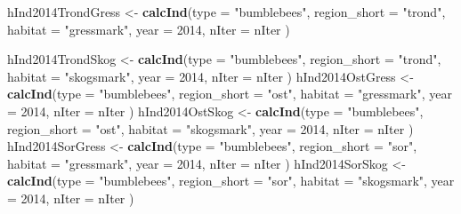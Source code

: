 \documentclass[]{article}
\newenvironment{Shaded}{\begin{snugshade}}{\end{snugshade}}
\newcommand{\KeywordTok}[1]{\textcolor[rgb]{0.13,0.29,0.53}{\textbf{#1}}}
\newcommand{\DataTypeTok}[1]{\textcolor[rgb]{0.13,0.29,0.53}{#1}}
\newcommand{\DecValTok}[1]{\textcolor[rgb]{0.00,0.00,0.81}{#1}}
\newcommand{\StringTok}[1]{\textcolor[rgb]{0.31,0.60,0.02}{#1}}
\newcommand{\NormalTok}[1]{#1}
\begin{document}
\begin{Shaded}
\begin{Highlighting}[]
\NormalTok{hInd2014TrondGress <-}\StringTok{ }\KeywordTok{calcInd}\NormalTok{(}\DataTypeTok{type =} \StringTok{"bumblebees"}\NormalTok{,}
                              \DataTypeTok{region_short =} \StringTok{"trond"}\NormalTok{,}
                              \DataTypeTok{habitat =} \StringTok{"gressmark"}\NormalTok{,}
                              \DataTypeTok{year =} \DecValTok{2014}\NormalTok{,}
                              \DataTypeTok{nIter =}\NormalTok{ nIter}
\NormalTok{                              )}
       
\NormalTok{hInd2014TrondSkog <-}\StringTok{ }\KeywordTok{calcInd}\NormalTok{(}\DataTypeTok{type =} \StringTok{"bumblebees"}\NormalTok{,}
                              \DataTypeTok{region_short =} \StringTok{"trond"}\NormalTok{,}
                              \DataTypeTok{habitat =} \StringTok{"skogsmark"}\NormalTok{,}
                              \DataTypeTok{year =} \DecValTok{2014}\NormalTok{,}
                              \DataTypeTok{nIter =}\NormalTok{ nIter}
\NormalTok{                              )}
\NormalTok{hInd2014OstGress <-}\StringTok{ }\KeywordTok{calcInd}\NormalTok{(}\DataTypeTok{type =} \StringTok{"bumblebees"}\NormalTok{,}
                              \DataTypeTok{region_short =} \StringTok{"ost"}\NormalTok{,}
                              \DataTypeTok{habitat =} \StringTok{"gressmark"}\NormalTok{,}
                              \DataTypeTok{year =} \DecValTok{2014}\NormalTok{,}
                              \DataTypeTok{nIter =}\NormalTok{ nIter}
\NormalTok{                              )}
\NormalTok{hInd2014OstSkog <-}\StringTok{ }\KeywordTok{calcInd}\NormalTok{(}\DataTypeTok{type =} \StringTok{"bumblebees"}\NormalTok{,}
                              \DataTypeTok{region_short =} \StringTok{"ost"}\NormalTok{,}
                              \DataTypeTok{habitat =} \StringTok{"skogsmark"}\NormalTok{,}
                              \DataTypeTok{year =} \DecValTok{2014}\NormalTok{,}
                              \DataTypeTok{nIter =}\NormalTok{ nIter}
\NormalTok{                              )}
\NormalTok{hInd2014SorGress <-}\StringTok{ }\KeywordTok{calcInd}\NormalTok{(}\DataTypeTok{type =} \StringTok{"bumblebees"}\NormalTok{,}
                              \DataTypeTok{region_short =} \StringTok{"sor"}\NormalTok{,}
                              \DataTypeTok{habitat =} \StringTok{"gressmark"}\NormalTok{,}
                              \DataTypeTok{year =} \DecValTok{2014}\NormalTok{,}
                              \DataTypeTok{nIter =}\NormalTok{ nIter}
\NormalTok{                              )}
\NormalTok{hInd2014SorSkog <-}\StringTok{ }\KeywordTok{calcInd}\NormalTok{(}\DataTypeTok{type =} \StringTok{"bumblebees"}\NormalTok{,}
                              \DataTypeTok{region_short =} \StringTok{"sor"}\NormalTok{,}
                              \DataTypeTok{habitat =} \StringTok{"skogsmark"}\NormalTok{,}
                              \DataTypeTok{year =} \DecValTok{2014}\NormalTok{,}
                              \DataTypeTok{nIter =}\NormalTok{ nIter}
\NormalTok{                              )}


\end{Highlighting}
\end{Shaded}
\end{document}
